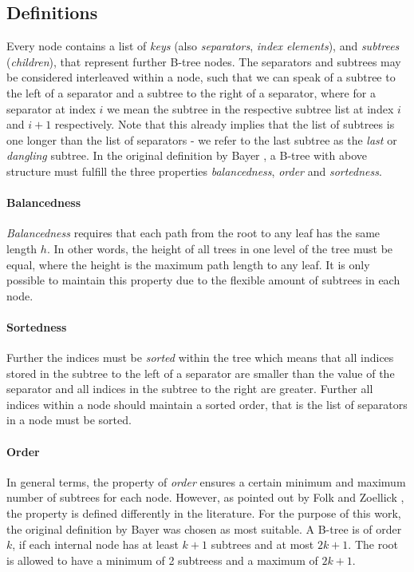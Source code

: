 \documentclass[a4paper,UKenglish,cleveref, autoref, thm-restate]{lipics-v2021}
\begin{document}
\subsection{Definitions}
\label{sec:data_structure_defs}

Every node contains a list of \textit{keys} (also \textit{separators}, \textit{index elements}), and \textit{subtrees} (\textit{children}),
that represent further B-tree nodes.
The separators and subtrees may be considered interleaved within a node,
such that we can speak of a subtree to the left of a separator and
a subtree to the right of a separator,
where for a separator at index $i$ we mean the subtree in the respective
subtree list at index $i$ and $i+1$ respectively.
Note that this already implies that the list of subtrees is one
longer than the list of separators - we refer to the last subtree
as the \textit{last} or \textit{dangling} subtree.
In the original definition by Bayer \cite{DBLP:journals/acta/BayerM72},
a B-tree with above structure must fulfill the three properties
\textit{balancedness}, \textit{order} and \textit{sortedness}.

\paragraph{Balancedness} \textit{Balancedness} requires
that each path from the root to any leaf has the same length $h$.
In other words, the height of all trees in one level of the tree must be equal,
where the height is the maximum path length to any leaf.
It is only possible to maintain this property
due to the flexible amount of subtrees in each node.

\paragraph{Sortedness} Further the indices must be \textit{sorted} within the tree which means that all indices stored
in the subtree to the left of a separator are smaller than the value of the separator
and all indices in the subtree to the right are greater.
Further all indices within a node should maintain a sorted order,
that is the list of separators in a node must be sorted.

\paragraph{Order} In general terms, the property of \textit{order} ensures a certain minimum and maximum
number of subtrees for each node.
However, as pointed out by Folk and Zoellick \cite{DBLP:books/daglib/0095349_mod},
the property is defined differently in the literature.
For the purpose of this work, the original definition by Bayer
was chosen as most suitable.
A B-tree is of order $k$, if each internal node has at least $k+1$
subtrees and at most $2k+1$.
The root is allowed to have a minimum of 2 subtreess and a maximum of $2k+1$.
\end{document}
